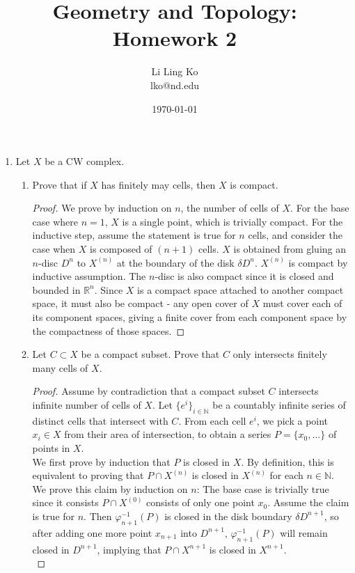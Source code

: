 \documentclass{article}
\begin{document}
\title{Geometry and Topology: Homework 2}
\author{Li Ling Ko\\ lko@nd.edu}
\date{\today}
\maketitle

\begin{enumerate}
  \item Let $X$ be a CW complex.
    \begin{enumerate}
      \item Prove that if $X$ has finitely may cells, then $X$ is compact.
        \begin{proof}
          We prove by induction on $n$, the number of cells of $X$. For the
          base case where $n=1$, $X$ is a single point, which is trivially
          compact. For the inductive step, assume the statement is true for
          $n$ cells, and consider the case when $X$ is composed of $(n+1)$
          cells. $X$ is obtained from gluing an $n$-disc $D^n$ to $X^{(n)}$
          at the boundary of the disk $\delta D^n$. $X^{(n)}$ is compact by
          inductive assumption. The $n$-disc is also compact since it is
          closed and bounded in $\mathbb{R}^n$. Since $X$ is a compact
          space attached to another compact space, it must also be compact
          - any open cover of $X$ must cover each of its component
          spaces, giving a finite cover from each component space by the
          compactness of those spaces.
        \end{proof}

      \item Let $C\subset X$ be a compact subset. Prove that $C$ only
        intersects finitely many cells of $X$.
        \begin{proof}
          Assume by contradiction that a compact subset $C$ intersects
          infinite number of cells of $X$. Let $\{e^i\}_{i\in\mathbb{N}}$
          be a countably infinite series of distinct cells that intersect
          with $C$. From each cell $e^i$, we pick a point $x_i\in X$ from
          their area of intersection, to obtain a series $P=\{x_0,\ldots\}$
          of points in $X$. \\

          We first prove by induction that $P$ is closed in $X$. By
          definition, this is equivalent to proving that $P\cap X^{(n)}$ is
          closed in $X^{(n)}$ for each $n\in\mathbb{N}$. We prove this
          claim by induction on $n$: The base case is trivially true since
          it consists $P\cap X^{(0)}$ consists of only one point $x_0$.
          Assume the claim is true for $n$. Then $\varphi_{n+1}^{-1}(P)$ is
          closed in the disk boundary $\delta D^{n+1}$, so after adding one
          more point $x_{n+1}$ into $D^{n+1}$, $\varphi_{n+1}^{-1}(P)$ will
          remain closed in $D^{n+1}$, implying that $P\cap X^{n+1}$ is
          closed in $X^{n+1}$. \\


\end{proof}
\end{enumerate}
\end{enumerate}
\end{document}
